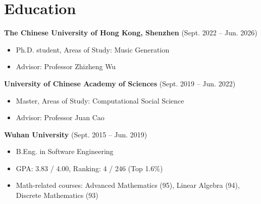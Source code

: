 \documentclass{resume}
\begin{document}
\section{Education}
{
  \small
  \textbf{The Chinese University of Hong Kong, Shenzhen} (Sept. 2022 -- Jun. 2026)
  \begin{itemize}
    \item Ph.D. student, Areas of Study: Music Generation
    \item Advisor: Professor Zhizheng Wu
  \end{itemize}
  \textbf{University of Chinese Academy of Sciences} (Sept. 2019 -- Jun. 2022)
  \small
  \begin{itemize}
    \item Master, Areas of Study: Computational Social Science
    \item Advisor: Professor Juan Cao
  \end{itemize}
  \textbf{Wuhan University} (Sept. 2015 -- Jun. 2019)
  \begin{itemize}
    \item B.Eng. in Software Engineering
    \item GPA: 3.83 / 4.00, Ranking: 4 / 246 (Top 1.6\%)
    \item Math-related courses: Advanced Mathematics (95), Linear Algebra (94), Discrete
          Mathematics (93)
  \end{itemize}
}

\end{document}
